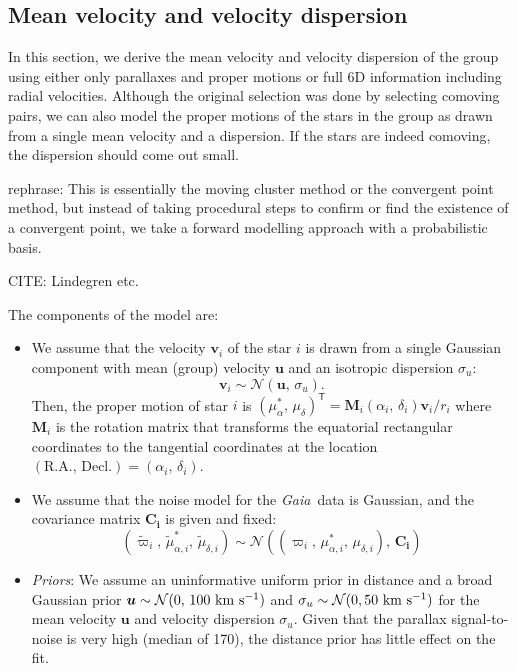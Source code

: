 \documentclass[modern,letterpaper]{aastex61}
\newcommand{\project}[1]{\textsl{#1}}
\newcommand{\gaia}{\project{Gaia}}
\newcommand{\normal}{{\mathcal{N}}}
\newcommand{\transp}[1]{{#1}^{\!\mathsf{T}}}
\newcommand{\bs}[1]{\boldsymbol{#1}}
\newcommand{\mat}[1]{\mathbf{#1}}
\renewcommand{\vec}[1]{\bs{#1}}
\newcommand{\kms}{\ensuremath{\rm km~s^{-1}}}
\newcommand{\pmra}{\ensuremath{\mu_\alpha^*}}
\newcommand{\pmdec}{\ensuremath{\mu_\delta}}
\newcommand{\todo}[1]{{\color{crimson}#1}}
\begin{document}
\subsection{Mean velocity and velocity dispersion}
\label{sec:fitting}

In this section, we derive the mean velocity and velocity dispersion of the
group using either only parallaxes and proper motions or full 6D information
including radial velocities.
Although the original selection was done by selecting comoving pairs, we can
also model the proper motions of the stars in the group as drawn from a single
mean velocity and a dispersion.
If the stars are indeed comoving, the dispersion should come out small.

\todo{rephrase:
This is essentially the moving cluster method or the convergent point method,
but instead of taking procedural steps to confirm or find the existence of a
convergent point, we take a forward modelling approach with a probabilistic basis.}

\todo{CITE: Lindegren etc.}



The components of the model are:
\begin{itemize}
  \item We assume that the velocity $\vec{v}_i$ of the star $i$ is drawn from
    a single Gaussian component with mean (group) velocity $\vec{u}$ and
    an isotropic dispersion $\sigma_{u}$:
    $$\vec{v}_i \sim \normal(\vec{u},\,\sigma_{u}).$$
    Then, the proper motion of star $i$ is
    $\transp{(\pmra,\,\pmdec)} = \mat{M}_i(\alpha_i,\,\delta_i) \vec{v}_i / r_i$ where
    $\mat{M}_i$ is the rotation matrix that transforms the equatorial
    rectangular coordinates to the tangential coordinates at the location
    $(\mathrm{R.A.},\,\mathrm{Decl.}) = (\alpha_i,\,\delta_i)$.

  \item We assume that the noise model for the \gaia\ data is Gaussian, and
    the covariance matrix $\mat{C_i}$ is given and fixed:
    $$(\tilde\varpi_i,\,\tilde\mu_{\alpha,i}^*,\,\tilde\mu_{\delta,i}) \sim
      \normal((\varpi_i,\,\mu_{\alpha,i}^*,\,\mu_{\delta,i}),\,\mat{C_i})$$

  \item \emph{Priors}:
    We assume an uninformative uniform prior in distance and a broad Gaussian
    prior $\vec{u} \sim \normal(0,\,100~\kms)$ and $\sigma_u \sim \normal(0, 50~\kms)$
    for the mean velocity $\vec{u}$ and velocity dispersion $\sigma_u$.
    Given that the parallax signal-to-noise is very high (median of 170),
    the distance prior has little effect on the fit.
\end{itemize}
\end{document}
